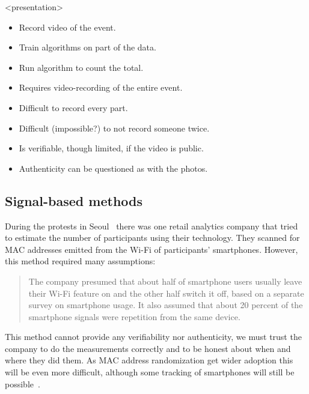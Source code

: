 \begin{frame}<presentation>
  \begin{solution}
    \begin{itemize}
      \item Record video of the event.
      \item Train algorithms on part of the data.
      \item Run algorithm to count the total.
    \end{itemize}
  \end{solution}

  \pause

  \begin{remark}
    \begin{itemize}
      \item Requires video-recording of the entire event.
      \item Difficult to record every part.
      \item Difficult (impossible?) to not record someone twice.
      \item Is verifiable, though limited, if the video is public.
      \item Authenticity can be questioned as with the photos.
    \end{itemize}
  \end{remark}
\end{frame}

\subsection<presentation>{Signal-based methods}

During the protests in Seoul~\cite{2016DemonstrationsInSeoul} there was one 
retail analytics company that tried to estimate the number of participants 
using their technology.
They scanned for MAC addresses emitted from the Wi-Fi of participants' 
smartphones.
However, this method required many assumptions:
\blockcquote{2016DemonstrationsInSeoul}{%
  The company presumed that about half of smartphone users usually leave their 
  Wi-Fi feature on and the other half switch it off, based on a separate survey 
  on smartphone usage. It also assumed that about 20 percent of the smartphone 
  signals were repetition from the same device.
}
This method cannot provide any verifiability nor authenticity, we must trust 
the company to do the measurements correctly and to be honest about when and 
where they did them.
As MAC address randomization get wider adoption this will be even more 
difficult, although some tracking of smartphones will still be 
possible~\cite{WhyMACRandomizationIsNotEnough}.

